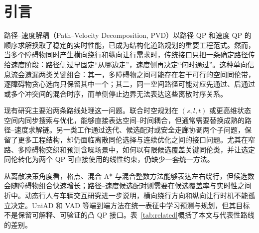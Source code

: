 \section{引言}
\label{sec:intro}

路径--速度解耦（Path--Velocity Decomposition, PVD）以路径 QP 和速度 QP 的顺序求解换取了稳定的实时性能，已成为结构化道路规划的重要工程范式\citep{kant1986pvd,fan2018baidu,apollo2024,zhou2021pathqp,zhou2021dliaps}。然而，当多个障碍物同时产生横向绕行和纵向让行需求时，传统接口只把一条确定路径传给速度阶段：路径侧过早固定“从哪边走”，速度侧再决定“何时通过”。这种单向信息流会遗漏两类关键组合：其一，多障碍物之间可能存在若干可行的空间同伦带，逐障碍物贪心选向只保留其中一个；其二，同一空间路径可能对应先通过、后通过或多个冲突间的混合时序，而单侧停止边界无法表达这些离散时序关系。

现有研究主要沿两条路线处理这一问题。联合时空规划在 $(s,l,t)$ 或更高维状态空间内同步搜索与优化\citep{morsali2021svm,hu2023_hybrid_astar_slt,micheli2023nmpc,han2024efficient,guo2024joint,hu2025_dp_nmpc}，能够直接表达空间--时间耦合，但通常需要替换成熟的路径--速度求解链。另一类工作通过迭代、候选配对或安全走廊协调两个子问题\citep{chen2019em,cheng2022gp,zhang2023_dp_rcg,yoon2024stcorridor,frenetcorridor2025,tariq2026enveloping}，保留了更多工程结构，却仍面临离散同伦选择与连续优化之间的接口问题。尤其在窄路、多障碍物交织和预测含噪场景中，如何以有限候选覆盖关键同伦类，并让选定同伦转化为两个 QP 可直接使用的线性约束，仍缺少一套统一方法。

从离散决策角度看，格点、混合 A* 与混合整数方法能够表达左右绕行，但候选数会随障碍物组合快速增长\citep{dolgov2010,kuwata2009rrt,mcnaughton2011lattice,kessler2023,narrowcorridor2022}；路径--速度候选配对则需要在候选覆盖率与实时性之间折中。动态行人与车辆交互研究进一步说明，横向绕行方向和纵向让行时机不能孤立决定\citep{crossingped2019,yangbo2023ped,pathspeedstructured2024}。UniAD 和 VAD 等端到端方法在统一表征中学习预测与规划\citep{hu2023uniad,jiang2023vad}，但其目标不是保留可解释、可验证的凸 QP 接口。表~\ref{tab:related}概括了本文与代表性路线的差别。

